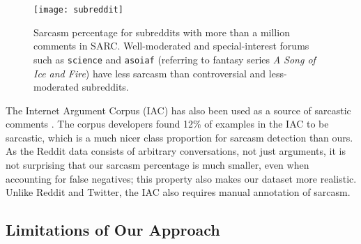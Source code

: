 \documentclass[10pt, a4paper]{article}
\begin{document}
\begin{figure}
	\centering
	\texttt{[image: subreddit]}
	\caption{\label{fig:subreddit_sarcasm} Sarcasm percentage for subreddits with more than a million comments in SARC. 
Well-moderated and special-interest forums such as \texttt{science} and \texttt{asoiaf} (referring to fantasy series \textit{A Song of Ice and Fire}) have less sarcasm than controversial and less-moderated subreddits.}
\end{figure}

The Internet Argument Corpus (IAC) has also been used as a source of sarcastic comments \cite{Walker:12}.
The corpus developers found 12\% of examples in the IAC to be sarcastic, which is a much nicer class proportion for sarcasm detection than ours.
As the Reddit data consists of arbitrary conversations, not just arguments, it is not surprising that our sarcasm percentage is much smaller, even when accounting for false negatives;
this property also makes our dataset more realistic.
Unlike Reddit and Twitter, the IAC also requires manual annotation of sarcasm.



\subsection{Limitations of Our Approach}
\label{subsec:limits}
\end{document}
